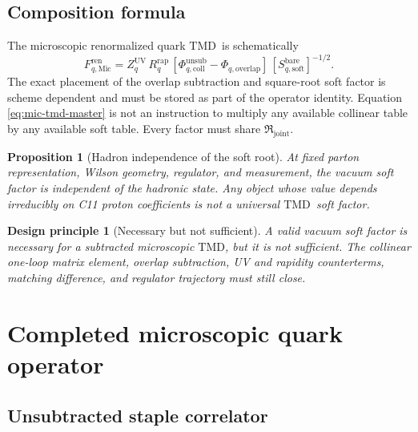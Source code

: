 \documentclass[11pt]{article}
\newtheorem{principle}[definition]{Design principle}
\newtheorem{proposition}[definition]{Proposition}
\newcommand{\TMD}{\ensuremath{\mathrm{TMD}}}
\newcommand{\Coll}{\ensuremath{\mathrm{coll}}}
\newcommand{\Soft}{\ensuremath{\mathrm{soft}}}
\newcommand{\Bare}{\ensuremath{\mathrm{bare}}}
\newcommand{\Ren}{\ensuremath{\mathrm{ren}}}
\newcommand{\Unsub}{\ensuremath{\mathrm{unsub}}}
\newcommand{\Mic}{\ensuremath{\mathrm{Mic}}}
\begin{document}
\subsection{Composition formula}

The microscopic renormalized quark \TMD\ is schematically
\begin{equation}
 F_{q,\Mic}^{\Ren}
 =
 Z_{q}^{\mathrm{UV}}\,
 R_{q}^{\mathrm{rap}}\,
 \left[
 \Phi_{q,\Coll}^{\Unsub}
 -
 \Phi_{q,\mathrm{overlap}}
 \right]\,
 \left[
 S_{q,\Soft}^{\Bare}
 \right]^{-1/2}.
 \label{eq:mic-tmd-master}
\end{equation}
The exact placement of the overlap subtraction and square-root soft factor is scheme dependent and must be stored as part of the operator identity.  Equation \eqref{eq:mic-tmd-master} is not an instruction to multiply any available collinear table by any available soft table.  Every factor must share \(\mathfrak R_{\mathrm{joint}}\).

\begin{proposition}[Hadron independence of the soft root]
\label{prop:soft-universal}
At fixed parton representation, Wilson geometry, regulator, and measurement, the vacuum soft factor is independent of the hadronic state.  Any object whose value depends irreducibly on C11 proton coefficients is not a universal \TMD\ soft factor.
\end{proposition}

\begin{principle}[Necessary but not sufficient]
A valid vacuum soft factor is necessary for a subtracted microscopic \TMD, but it is not sufficient.  The collinear one-loop matrix element, overlap subtraction, UV and rapidity counterterms, matching difference, and regulator trajectory must still close.
\end{principle}

\section{Completed microscopic quark operator}
\label{sec:operator}

\subsection{Unsubtracted staple correlator}
\end{document}
